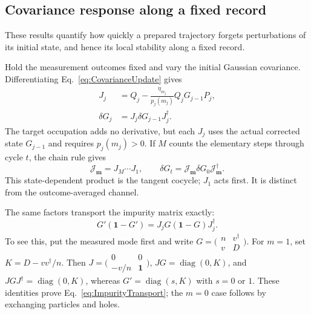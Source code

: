 \documentclass[aps,prb,10pt,twocolumn,superscriptaddress,longbibliography,floatfix]{revtex4-2}
\newcommand{\rec}{\mathbf m}   %
\newcommand{\newtext}[1]{{\color{blue}#1}}
\begin{document}
{\color{blue}
\subsection{Covariance response along a fixed record}
\label{app:TrajectoryResponse}
\newtext{These results quantify how quickly a prepared trajectory forgets perturbations of its initial state, and hence its local stability along a fixed record.}

Hold the measurement outcomes fixed and vary the initial Gaussian covariance. Differentiating Eq.~\eqref{eq:CovarianceUpdate} gives
\begin{align}
 J_j&=Q_j-\frac{\eta_{m_j}}{p_j(m_j)}Q_jG_{j-1}P_j,\nonumber\\
 \delta G_j&=J_j\delta G_{j-1}J_j^\dagger.
 \label{eq:BranchCovarianceTangent}
\end{align}
The target occupation adds no derivative, but each $J_j$ uses the actual corrected state $G_{j-1}$ and requires $p_j(m_j)>0$. If $M$ counts the elementary steps through cycle $t$, the chain rule gives
\begin{equation}
 \mathcal J_{\rec}=J_M\cdots J_1,\qquad
 \delta G_t=\mathcal J_{\rec}\delta G_0\mathcal J_{\rec}^\dagger.
 \label{eq:CovarianceTangentProduct}
\end{equation}
This state-dependent product is the tangent cocycle; $J_1$ acts first. It is distinct from the outcome-averaged channel.

The same factors transport the impurity matrix exactly:
\begin{equation}
 G'(\mathbf1-G')=J_jG(\mathbf1-G)J_j^\dagger.
 \label{eq:ImpurityTransport}
\end{equation}
To see this, put the measured mode first and write $G=\bigl(\begin{smallmatrix}n&v^\dagger\\v&D\end{smallmatrix}\bigr)$. For $m=1$, set $K=D-vv^\dagger/n$. Then $J=\bigl(\begin{smallmatrix}0&0\\-v/n&\mathbf1\end{smallmatrix}\bigr)$, $JG=\operatorname{diag}(0,K)$, and $JGJ^\dagger=\operatorname{diag}(0,K)$, whereas $G'=\operatorname{diag}(s,K)$ with $s=0$ or $1$. These identities prove Eq.~\eqref{eq:ImpurityTransport}; the $m=0$ case follows by exchanging particles and holes.

}
\end{document}
